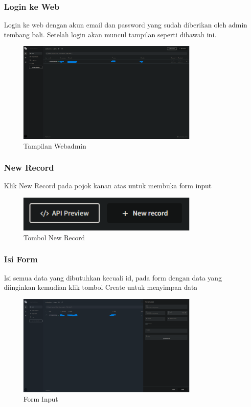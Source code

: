 \subsubsection{Login ke Web}
Login ke web dengan akun email dan password yang sudah diberikan oleh admin tembang bali.
Setelah login akan muncul tampilan seperti dibawah ini.


\begin{figure}[H]
    \centering
    \includegraphics[width=0.8\textwidth]{assets/app.png}
    \caption{Tampilan Webadmin}
\end{figure}


\subsubsection{New Record}
Klik New Record pada pojok kanan atas untuk membuka form input

\begin{figure}[H]
    \centering
    \includegraphics[width=0.8\textwidth]{assets/new-record.png}
    \caption{Tombol New Record}
\end{figure}

\subsubsection{Isi Form}
Isi semua data yang dibutuhkan kecuali id, pada form dengan data yang diinginkan kemudian klik tombol Create untuk menyimpan data

\begin{figure}[H]
    \centering
    \includegraphics[width=0.8\textwidth]{assets/form.png}
    \caption{Form Input}
\end{figure}


